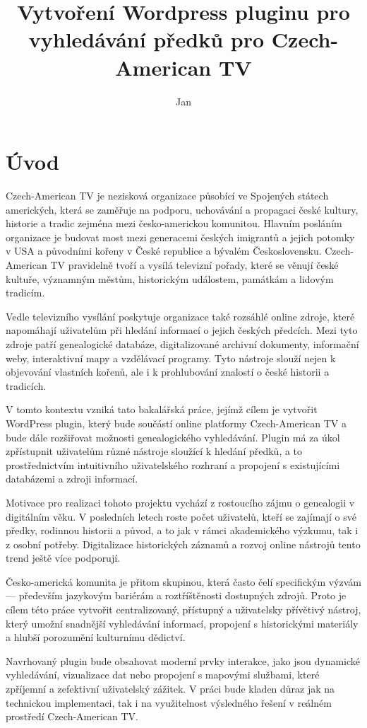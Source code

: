 \documentclass[czech, ba, kiv, he]{fasthesis}
\title{Vytvoření Wordpress pluginu pro vyhledávání předků pro Czech-American TV}
\author{Jan}{Čácha}{}{}
\begin{document}
\frontpages[tm]
\tableofcontents

\chapter{Úvod}

Czech-American TV je nezisková organizace působící ve Spojených státech amerických, která se zaměřuje na podporu, uchovávání a propagaci české kultury, historie a tradic zejména mezi česko-americkou komunitou. Hlavním posláním organizace je budovat most mezi generacemi českých imigrantů a jejich potomky v USA a původními kořeny v České republice a bývalém Československu. Czech-American TV pravidelně tvoří a vysílá televizní pořady, které se věnují české kultuře, významným městům, historickým událostem, památkám a lidovým tradicím.

Vedle televizního vysílání poskytuje organizace také rozsáhlé online zdroje, které napomáhají uživatelům při hledání informací o jejich českých předcích. Mezi tyto zdroje patří genealogické databáze, digitalizované archivní dokumenty, informační weby, interaktivní mapy a vzdělávací programy. Tyto nástroje slouží nejen k objevování vlastních kořenů, ale i k prohlubování znalostí o české historii a tradicích.

V tomto kontextu vzniká tato bakalářská práce, jejímž cílem je vytvořit WordPress plugin, který bude součástí online platformy Czech-American TV a bude dále rozšiřovat možnosti genealogického vyhledávání. Plugin má za úkol zpřístupnit uživatelům různé nástroje sloužící k hledání předků, a to prostřednictvím intuitivního uživatelského rozhraní a propojení s existujícími databázemi a zdroji informací.

Motivace pro realizaci tohoto projektu vychází z rostoucího zájmu o genealogii v digitálním věku. V posledních letech roste počet uživatelů, kteří se zajímají o své předky, rodinnou historii a původ, a to jak v rámci akademického výzkumu, tak i z osobní potřeby. Digitalizace historických záznamů a rozvoj online nástrojů tento trend ještě více podporují.

Česko-americká komunita je přitom skupinou, která často čelí specifickým výzvám — především jazykovým bariérám a roztříštěnosti dostupných zdrojů. Proto je cílem této práce vytvořit centralizovaný, přístupný a uživatelsky přívětivý nástroj, který umožní snadnější vyhledávání informací, propojení s historickými materiály a hlubší porozumění kulturnímu dědictví.

Navrhovaný plugin bude obsahovat moderní prvky interakce, jako jsou dynamické vyhledávání, vizualizace dat nebo propojení s mapovými službami, které zpříjemní a zefektivní uživatelský zážitek. V práci bude kladen důraz jak na technickou implementaci, tak i na využitelnost výsledného řešení v reálném prostředí Czech-American TV.
\end{document}
